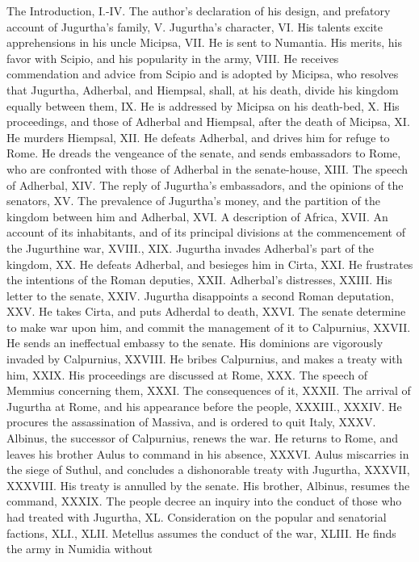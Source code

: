 The Introduction, I.-IV. The author's declaration of his design, and
prefatory account of Jugurtha's family, V. Jugurtha's character, VI.
His talents excite apprehensions in his uncle Micipsa, VII. He is sent
to Numantia. His merits, his favor with Scipio, and his popularity in
the army, VIII. He receives commendation and advice from Scipio and is
adopted by Micipsa, who resolves that Jugurtha, Adherbal, and
Hiempsal, shall, at his death, divide his kingdom equally between
them, IX. He is addressed by Micipsa on his death-bed, X. His
proceedings, and those of Adherbal and Hiempsal, after the death of
Micipsa, XI. He murders Hiempsal, XII. He defeats Adherbal, and drives
him for refuge to Rome. He dreads the vengeance of the senate, and
sends embassadors to Rome, who are confronted with those of Adherbal
in the senate-house, XIII. The speech of Adherbal, XIV. The reply of
Jugurtha's embassadors, and the opinions of the senators, XV. The
prevalence of Jugurtha's money, and the partition of the kingdom
between him and Adherbal, XVI. A description of Africa, XVII. An
account of its inhabitants, and of its principal divisions at the
commencement of the Jugurthine war, XVIII., XIX. Jugurtha invades
Adherbal's part of the kingdom, XX. He defeats Adherbal, and besieges
him in Cirta, XXI. He frustrates the intentions of the Roman deputies,
XXII. Adherbal's distresses, XXIII. His letter to the senate, XXIV.
Jugurtha disappoints a second Roman deputation, XXV. He takes Cirta,
and puts Adherdal to death, XXVI. The senate determine to make war
upon him, and commit the management of it to Calpurnius, XXVII. He
sends an ineffectual embassy to the senate. His dominions are
vigorously invaded by Calpurnius, XXVIII. He bribes Calpurnius, and
makes a treaty with him, XXIX. His proceedings are discussed at Rome,
XXX. The speech of Memmius concerning them, XXXI. The consequences of
it, XXXII. The arrival of Jugurtha at Rome, and his appearance before
the people, XXXIII., XXXIV. He procures the assassination of Massiva,
and is ordered to quit Italy, XXXV. Albinus, the successor of
Calpurnius, renews the war. He returns to Rome, and leaves his brother
Aulus to command in his absence, XXXVI. Aulus miscarries in the siege
of Suthul, and concludes a dishonorable treaty with Jugurtha, XXXVII,
XXXVIII. His treaty is annulled by the senate. His brother, Albinus,
resumes the command, XXXIX. The people decree an inquiry into the
conduct of those who had treated with Jugurtha, XL. Consideration on
the popular and senatorial factions, XLI., XLII. Metellus assumes the
conduct of the war, XLIII. He finds the army in Numidia without

